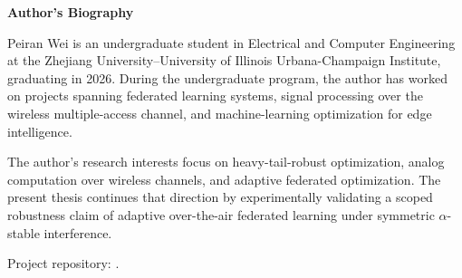 \centerline{\xiaoyi\bf Author's Biography}

Peiran Wei is an undergraduate student in Electrical and Computer
Engineering at the Zhejiang University--University of Illinois
Urbana-Champaign Institute, graduating in 2026. During the
undergraduate program, the author has worked on projects spanning
federated learning systems, signal processing over the wireless
multiple-access channel, and machine-learning optimization for
edge intelligence.

The author's research interests focus on heavy-tail-robust
optimization, analog computation over wireless channels, and
adaptive federated optimization. The present thesis continues that
direction by experimentally validating a scoped robustness claim of
adaptive over-the-air federated learning under symmetric
$\alpha$-stable interference.

Project repository:
\href{https://github.com/promissa/st4001_project}{\texttt{}}.
